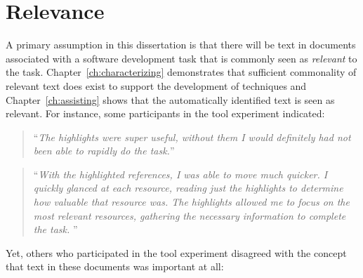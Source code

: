 



\section{Relevance}
\label{cp7:tools}

A primary assumption in this dissertation
is that there will be text in documents
associated with a software development
task that is commonly seen as \textit{relevant}
to the task. Chapter~\ref{ch:characterizing} demonstrates
that sufficient commonality of relevant
text does exist to support the development
of techniques and Chapter~\ref{ch:assisting} shows
that the automatically identified text
is seen as relevant. For instance,
some participants in the \acs{tool}
experiment indicated:

 
\smallskip
\begin{quote}
    ``\textit{The highlights were super useful, without them I would definitely had not been able to rapidly do the task.}''
\end{quote}


\begin{quote}
``\textit{With the highlighted references, I was able to move much quicker. I quickly glanced at each resource, reading just the highlights to determine how valuable that resource was. The highlights allowed me to focus on the most relevant resources, gathering the necessary information to complete the task. 
}''
\end{quote}

Yet, others who participated in the \acs{tool}
experiment disagreed with the concept that text
in these documents was important at all:







